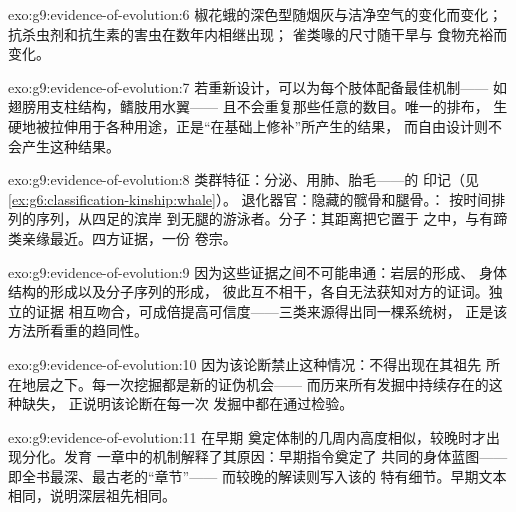 \begin{solution}{exo:g9:evidence-of-evolution:6}
椒花蛾的深色型随烟灰与洁净空气的变化而变化；
抗杀虫剂和抗生素的害虫在数年内相继出现；
雀类喙的尺寸随干旱与
食物充裕而变化。
\end{solution}

\begin{solution}{exo:g9:evidence-of-evolution:7}
若重新设计，可以为每个肢体配备最佳机制——
如翅膀用支柱结构，鳍肢用水翼——
且不会重复那些任意的数目。唯一的排布，
生硬地被拉伸用于各种用途，正是“在基础上修补”所产生的结果，
而自由设计则不会产生这种结果。
\end{solution}

\begin{solution}{exo:g9:evidence-of-evolution:8}
类群特征：分泌、用肺、胎毛——的
印记（见\cref{ex:g6:classification-kinship:whale}）。
退化器官：隐藏的髋骨和腿骨。：
按时间排列的序列，从四足的滨岸
到无腿的游泳者。分子：其距离把它置于
之中，与有蹄类亲缘最近。四方证据，一份
卷宗。
\end{solution}

\begin{solution}{exo:g9:evidence-of-evolution:9}
因为这些证据之间不可能串通：岩层的形成、
身体结构的形成以及分子序列的形成，
彼此互不相干，各自无法获知对方的证词。独立的证据
相互吻合，可成倍提高可信度——三类来源得出同一棵系统树，
正是该方法所看重的趋同性。
\end{solution}

\begin{solution}{exo:g9:evidence-of-evolution:10}
因为该论断禁止这种情况：不得出现在其祖先
所在地层之下。每一次挖掘都是新的证伪机会——
而历来所有发掘中持续存在的这种缺失，
正说明该论断在每一次
发掘中都在通过检验。
\end{solution}

\begin{solution}{exo:g9:evidence-of-evolution:11}
在早期
奠定体制的几周内高度相似，较晚时才出现分化。发育
一章中的机制解释了其原因：早期指令奠定了
共同的身体蓝图——即全书最深、最古老的“章节”——
而较晚的解读则写入该的
特有细节。早期文本相同，说明深层祖先相同。
\end{solution}

